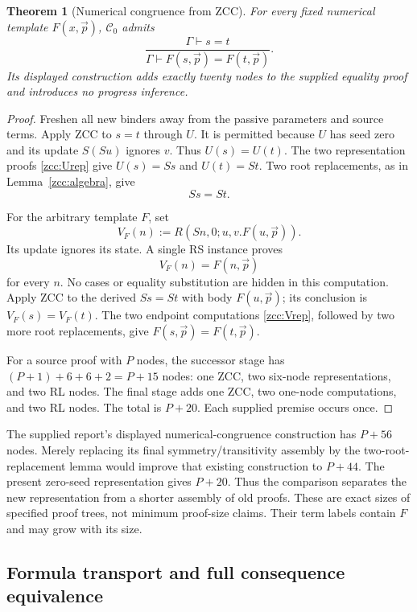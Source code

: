 \documentclass[11pt,letterpaper]{article}
\newtheorem{theorem}{Theorem}[section]
\theoremstyle{definition}\newtheorem{definition}[theorem]{Definition}
\theoremstyle{remark}\newtheorem{remark}[theorem]{Remark}
\begin{document}
\begin{theorem}[Numerical congruence from ZCC]\label{zcc:numerical}
For every fixed numerical template $F(x,\vec p)$, $\mathcal C_0$ admits
\[
 \frac{\Gamma\vdash s=t}
      {\Gamma\vdash F(s,\vec p)=F(t,\vec p)}.
\]
Its displayed construction adds exactly twenty nodes to the supplied
equality proof and introduces no progress inference.
\end{theorem}
\begin{proof}
Freshen all new binders away from the passive parameters and source terms.
Apply ZCC to $s=t$ through $U$. It is permitted because $U$ has seed zero
and its update $S(Su)$ ignores $v$. Thus $U(s)=U(t)$. The two representation
proofs \eqref{zcc:Urep} give $U(s)=Ss$ and $U(t)=St$.
Two root replacements, as in Lemma~\ref{zcc:algebra}, give
\[
                              Ss=St.
 \label{zcc:successor}
\]

For the arbitrary template $F$, set
\[
                  V_F(n):=R(Sn,0;u,v.F(u,\vec p)).
 \label{zcc:V}
\]
Its update ignores its state. A single RS instance proves
\[
                         V_F(n)=F(n,\vec p)
 \tag{V}\label{zcc:Vrep}
\]
for every $n$. No cases or equality substitution are hidden in this
computation. Apply ZCC to the derived $Ss=St$ with body $F(u,\vec p)$;
its conclusion is $V_F(s)=V_F(t)$. The two endpoint computations
\eqref{zcc:Vrep}, followed by two more root replacements, give
$F(s,\vec p)=F(t,\vec p)$.

For a source proof with $P$ nodes, the successor stage has
$(P+1)+6+6+2=P+15$ nodes: one ZCC, two six-node representations, and two
RL nodes. The final stage adds one ZCC, two one-node computations, and
two RL nodes. The total is $P+20$. Each supplied premise occurs once.
\end{proof}

The supplied report's displayed numerical-congruence construction has
$P+56$ nodes. Merely replacing its final symmetry/transitivity assembly
by the two-root-replacement lemma would improve that existing construction
to $P+44$. The present zero-seed representation gives $P+20$. Thus the
comparison separates the new representation from a shorter assembly of
old proofs. These are exact sizes of specified proof trees, not minimum
proof-size claims. Their term labels contain $F$ and may grow with its size.

\subsection{Formula transport and full consequence equivalence}
\end{document}
